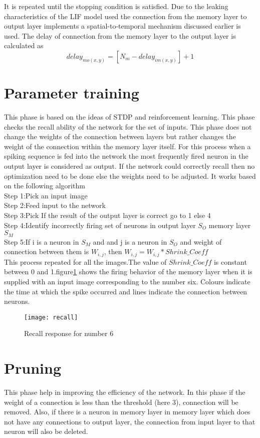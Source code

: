 It is repeated until the stopping condition is satisfied. Due to the leaking
characteristics of the LIF model used the connection from the memory layer to
output layer implements a spatial-to-temporal mechanism discussed earlier is
used. The delay of connection from the memory layer to the output layer is
calculated as
\begin{equation*}
    delay_{mo(x,y)}=[N_m-delay_{im(x,y)}]+1
\end{equation*}
\section{Parameter training}
This phase is based on the ideas of STDP and reinforcement learning. This phase
checks the recall ability of the network for the set of inputs. This phase does
not change the weights of the connection between layers but rather changes the
weight of the connection within the memory layer itself. For this process when
a spiking sequence is fed into the network the most frequently fired neuron in
the output layer is considered as output. If the network could correctly recall
then no optimization need to be done else the weights need to be adjusted. It
works based on the following algorithm \\Step 1:Pick an input image\\ Step
2:Feed input to the network\\ Step 3:Pick If the result of the output layer is
correct go to 1 else 4\\ Step 4:Identify incorrectly firing set of neurons in
output layer $S_{O}$ memory layer $S_{M}$ \\ Step 5:If i is a neuron in $S_M$
and and j is a neuron in $S_O$ and weight of connection between them is
$W_{i,j}$, then $W_{i,j}=W_{i,j}*Shrink\_Coeff$\\ This process repeated for all
the images.The value of $Shrink\_Coeff$ is constant between 0 and
1.figure\ref{recall} shows the firing behavior of the memory layer when it is
supplied with an input image corresponding to the number six. Colours indicate
the time at which the spike occurred and lines indicate the connection between
neurons.
\begin{figure}[h!]
    \centering
    \texttt{[image: recall]}
    \caption{Recall response for number 6}\label{recall}
\end{figure}
\section{Pruning}
This phase help in improving the efficiency of the network. In this phase if
the weight of a connection is less than the threshold (here 3), connection will
be removed. Also, if there is a neuron in memory layer in memory layer which
does not have any connections to output layer, the connection from input layer
to that neuron will also be deleted.

